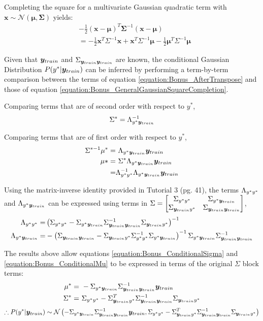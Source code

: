 \documentclass[a4paper,12pt]{article}
\begin{document}
Completing the square for a multivariate Gaussian quadratic term with \\
$\bm{x} \sim \mathcal{N} \left( \bm{\mu}, \bm{\Sigma} \right)$ yields:
\begin{align}
	& - \frac{1}{2} ( \bm{x} - \bm{\mu} )^{T} \bm{\Sigma}^{-1} ( \bm{x} - \bm{\mu} ) \\
    & \label{equation:Bonus_GeneralGaussianSquareCompletion} = - \frac{1}{2} \bm{x}^{T} \Sigma^{-1} \bm{x} + \bm{x}^{T} \Sigma^{-1} \bm{\mu}
    - \frac{1}{2} \bm{\mu}^{T} \Sigma^{-1} \bm{\mu}
\end{align}

Given that $\bm{y}_{train}$ and $\Sigma_{\bm{y}_{train} \bm{y}_{train}}$ are known, the conditional Gaussian Distribution $P(y^* | \bm{y}_{train})$ can be inferred by performing a term-by-term comparison between the terms of equation \ref{equation:Bonus_AfterTranspose} and those of equation \ref{equation:Bonus_GeneralGaussianSquareCompletion}.

Comparing terms that are of second order with respect to $y^*$,
\begin{align}
	\label{equation:Bonus_ConditionalSigma} \Sigma^* = \Lambda_{y^* \bm{y}_{train}}^{-1}
\end{align}

Comparing terms that are of first order with respect to $y^*$,
\begin{align}
	\Sigma^{*-1} \mu^{*} =& \ \Lambda_{y^* \bm{y}_{train}} \bm{y}_{train} \\
    \mu* =& \ \Sigma^* \Lambda_{y^* \bm{y}_{train}} \bm{y}_{train} \\
    \label{equation:Bonus_ConditionalMu} =& \Lambda_{y^* y^*}^{-1} \Lambda_{y^* \bm{y}_{train}} \bm{y}_{train}
\end{align}

Using the matrix-inverse identity provided in Tutorial 3 (pg. 41), the terms $\Lambda_{y^* y^*}$ and $\Lambda_{y^* \bm{y}_{train}}$ can be expressed using terms in $\Sigma = \begin{bmatrix} \Sigma_{y^* y^*} & \Sigma_{y^* \bm{y}_{train}} \\ \Sigma_{\bm{y}_{train} y^*} & \Sigma_{\bm{y}_{train} \bm{y}_{train}} \end{bmatrix}$,
\begin{align}
	\Lambda_{y^* y^*} =& \left( \Sigma_{y^* y^*} - \Sigma_{y^* \bm{y}_{train}} \Sigma_{\bm{y}_{train} \bm{y}_{train}}^{-1} \Sigma_{\bm{y}_{train} y^*} \right)^{-1} \\
    \Lambda_{y^* \bm{y}_{train}} =& - \left( \Sigma_{\bm{y}_{train} \bm{y}_{train}} - \Sigma_{\bm{y}_{train} y^*} \Sigma_{y^* y^*}^{-1} \Sigma_{y^* \bm{y}_{train}} \right)^{-1} 
    	\Sigma_{y^* \bm{y}_{train}} \Sigma_{\bm{y}_{train} \bm{y}_{train}}^{-1} \\
\end{align}

The results above allow equations \ref{equation:Bonus_ConditionalSigma} and \ref{equation:Bonus_ConditionalMu} to be expressed in terms of the original $\Sigma$ block terms:
\begin{align}
	\mu^* =& \ - \Sigma_{y^* \bm{y}_{train}} \Sigma_{\bm{y}_{train} \bm{y}_{train}}^{-1} \bm{y}_{train} \\
	\Sigma^* =& \ \Sigma_{y^* y^*} - \Sigma_{\bm{y}_{train} y^*}^{T} \Sigma_{\bm{y}_{train} \bm{y}_{train}}^{-1} \Sigma_{\bm{y}_{train} y^*}
\end{align}
\begin{align}
	\therefore P(y^* | \bm{y}_{train}) \sim \mathcal{N} 
    \left( - \Sigma_{y^* \bm{y}_{train}} \Sigma_{\bm{y}_{train} \bm{y}_{train}}^{-1} \bm{y}_{train}, \Sigma_{y^* y^*} - \Sigma_{\bm{y}_{train} y^*}^{T} \Sigma_{\bm{y}_{train} \bm{y}_{train}}^{-1} \Sigma_{\bm{y}_{train} y^*} \right)
\end{align}
\clearpage
\end{document}
